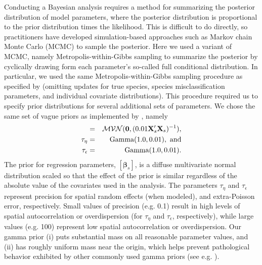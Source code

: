 \documentclass[]{rsos}%
\begin{document}
Conducting a Bayesian analysis requires a method for summarizing the posterior distribution of model parameters, where the posterior distribution is proportional to the prior distribution times the likelihood.  This is difficult to do directly, so practitioners have developed simulation-based approaches such as Markov chain Monte Carlo (MCMC) to sample the posterior.  Here we used a variant of MCMC, namely Metropolis-within-Gibbs sampling \cite{Gelman2004} to summarize the posterior by cyclically drawing form each parameter's so-called full conditional distribution.  In particular, we used the same Metropolis-within-Gibbs sampling procedure as specified by \cite{ConnEtAl2014} (omitting updates for true species, species misclassification parameters, and individual covariate distributions).  This procedure required us to specify prior distributions for several additional sets of parameters.  We chose the same set of vague priors as implemented by \cite{ConnEtAl2014}, namely
\begin{eqnarray*}
  [\boldsymbol{\beta}_s] & = & \mathcal{MVN}({\bf 0},(0.01 {\bf X}_s^\prime {\bf X}_s)^{-1}), \\
  \tau_\eta  & = &  \text{Gamma}(1.0,0.01), \text{ and} \\
  \tau_\epsilon & = & \text{Gamma}(1.0,0.01).
\end{eqnarray*}
The prior for regression parameters, $[\boldsymbol{\beta}_s]$, is a diffuse multivariate normal distribution scaled so that the effect of the prior is similar regardless of the absolute value of the covariates used in the analysis. The parameters $\tau_\eta$ and $\tau_\epsilon$ represent precision for spatial random effects (when modeled), and extra-Poisson error, respectively.  Small values of precision (e.g. 0.1) result in high levels of spatial autocorrelation or overdispersion (for $\tau_\eta$ and $\tau_\epsilon$, respectively), while large values (e.g. 100) represent low spatial autocorrelation or overdispersion.  Our gamma prior (i) puts substantial mass on all reasonable parameter values, and (ii) has roughly uniform mass near the origin, which helps prevent pathological behavior exhibited by other commonly used gamma priors (see e.g. \cite{Gelman2006}).
\end{document}
